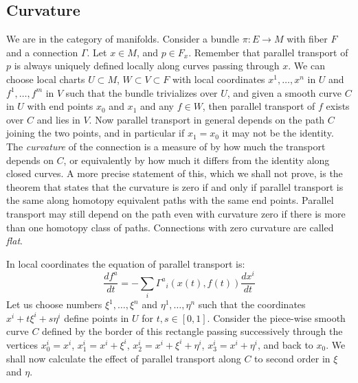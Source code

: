 \documentclass[12pt,titlepage]{article}
\begin{document}
\subsection{Curvature}
We are in the category of manifolds. Consider a bundle \(\pi:E \to M\)
with fiber \(F\) and a connection \(\Gamma\). Let \(x\in M \), and
\(p\in F_x\). Remember that parallel transport of \(p\) is always uniquely
defined locally along curves passing through \(x\).  We can choose local
charts
\(U\subset M\), \(W \subset V \subset F\) with
local coordinates \(x^1,\dots,x^n\)  in \(U\) and \(f^1,\dots,f^m\) in
\(V\)
 such that the bundle
trivializes over \(U\), and
given a smooth curve \(C\) in \(U\) with end points
\(x_0\) and \(x_1\) and any \(f\in W\), then parallel transport of \(f\)
exists over \(C\) and lies in \(V\).  Now parallel transport in general
depends on the path \(C\) joining the two points, and in particular if
\(x_1=x_0\) it may not be the identity. The {\em curvature\/}
%
of the
connection is a measure of by how much the transport depends on \(C\),
or equivalently by how much it differs from the identity along closed
curves. A more precise statement of this, which we shall not prove, 
is the theorem that states that
the curvature is zero if and only if parallel transport is the same
along homotopy equivalent paths with the same end points. Parallel
transport may still depend on the path even with curvature zero if there
is more than one homotopy class of paths. Connections with zero
curvature are called 
{\em flat\/}.

In local coordinates the equation of parallel transport is:
\[
\frac{df^a}{dt} = -\sum_i\Gamma^a{}_i(x(t),f(t))\frac{dx^i}{dt}
\]%
Let us choose numbers \(\xi^1,\dots,\xi^n\) and \(\eta^1,\dots,\eta^n\)
such that the coordinates  \(x^i + t\xi^i + s\eta^i\)  define points in
\(U\) for \(t,s\in [0,1]\). Consider the piece-wise smooth curve \(C\)
defined by the border of this rectangle passing successively through the
vertices  \(x_0^i=x^i\), \(x_1^i=x^i + \xi^i\),
\(x_2^i=x^i+\xi^i+\eta^i\), \(x_3^i=x^i+\eta^i\),
and back to \(x_0\).
We shall now calculate the effect of parallel transport
along \(C\) to second order in \(\xi\) and \(\eta\).
\end{document}
